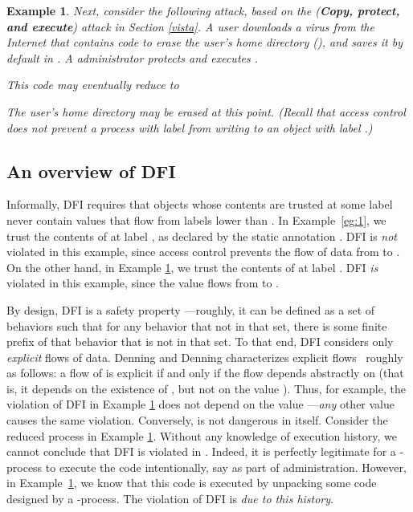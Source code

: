 \documentclass{sigplanconf}
\newtheorem{example}[definition]{Example}
\begin{document}
\begin{example}\label{eg:2} \rm
Next, consider the following attack, based on the ({\bf Copy, protect, and execute}) attack in Section \ref{vista}. 
A  user 
downloads a virus from the Internet that contains code to erase the user's home directory (), and saves it by default in . A 
administrator protects and executes .

This code may eventually reduce to 

The user's home directory may be erased at this point.  (Recall that access control does not prevent a process with label  from writing to an
object with label .)
\end{example}

\subsection{An overview of DFI}\label{introDFI}
Informally, DFI requires that objects whose contents are trusted at some label  never contain values that flow from labels lower than . In Example~\ref{eg:1}, we trust the contents of  at label , as declared by the static annotation . DFI is \emph{not} violated in this example, since access control prevents the flow of data from  to . On the other hand, in Example \ref{eg:2}, we trust the contents of  at label . DFI \emph{is} violated in this example, since the value  flows from  to . 

By design, DFI is a safety property  \cite{alpernschneider}---roughly, it can be defined as a set of behaviors such that for any behavior that not in that set, there is some finite prefix of that behavior that is not in that set. To that end, DFI considers only \emph{explicit} flows of data. Denning and Denning characterizes explicit flows~\cite{denningcert} roughly as follows: a flow of  is explicit if and only if the flow depends abstractly on  (that is, it depends on the existence of , but not on the value ). Thus, for example, the violation of DFI in Example \ref{eg:2} does not depend on the value ---\emph{any} other value causes the same violation. Conversely,  is not dangerous in itself. Consider the reduced process 
in Example \ref{eg:2}. Without any knowledge of execution history, we cannot conclude that DFI is violated in . Indeed, it is perfectly legitimate for a -process to execute the code  
intentionally, say as part of administration. However, in Example~\ref{eg:2}, we know that this code is executed by unpacking some code designed by a -process. The violation of DFI is \emph{due to this history}. 
\end{document}
